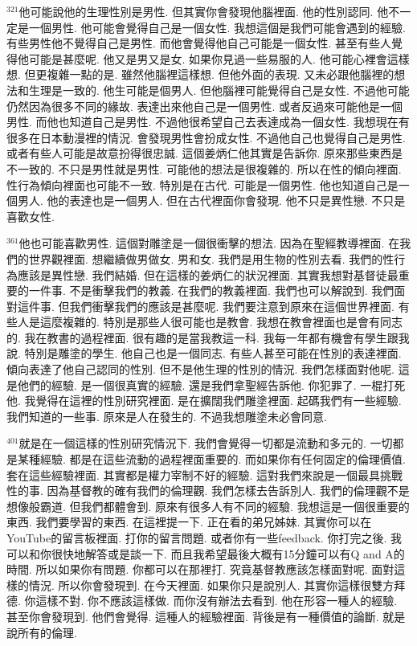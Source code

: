 \documentclass{book}
\begin{document}
$^{321}$他可能說他的生理性別是男性.
但其實你會發現他腦裡面.
他的性別認同.
他不一定是一個男性.
他可能會覺得自己是一個女性.
我想這個是我們可能會遇到的經驗.
有些男性他不覺得自己是男性.
而他會覺得他自己可能是一個女性.
甚至有些人覺得他可能是甚麼呢.
他又是男又是女.
如果你見過一些易服的人.
他可能心裡會這樣想.
但更複雜一點的是.
雖然他腦裡這樣想.
但他外面的表現.
又未必跟他腦裡的想法和生理是一致的.
他生可能是個男人.
但他腦裡可能覺得自己是女性.
不過他可能仍然因為很多不同的緣故.
表達出來他自己是一個男性.
或者反過來可能他是一個男性.
而他也知道自己是男性.
不過他很希望自己去表達成為一個女性.
我想現在有很多在日本動漫裡的情況.
會發現男性會扮成女性.
不過他自己也覺得自己是男性.
或者有些人可能是故意扮得很忠誠.
這個姜炳仁他其實是告訴你.
原來那些東西是不一致的.
不只是男性就是男性.
可能他的想法是很複雜的.
所以在性的傾向裡面.
性行為傾向裡面也可能不一致.
特別是在古代.
可能是一個男性.
他也知道自己是一個男人.
他的表達也是一個男人.
但在古代裡面你會發現.
他不只是異性戀.
不只是喜歡女性.

$^{361}$他也可能喜歡男性.
這個對雕塗是一個很衝擊的想法.
因為在聖經教導裡面.
在我們的世界觀裡面.
想繼續做男做女.
男和女.
我們是用生物的性別去看.
我們的性行為應該是異性戀.
我們結婚.
但在這樣的姜炳仁的狀況裡面.
其實我想對基督徒最重要的一件事.
不是衝擊我們的教義.
在我們的教義裡面.
我們也可以解說到.
我們面對這件事.
但我們衝擊我們的應該是甚麼呢.
我們要注意到原來在這個世界裡面.
有些人是這麼複雜的.
特別是那些人很可能也是教會.
我想在教會裡面也是會有同志的.
我在教書的過程裡面.
很有趣的是當我教這一科.
我每一年都有機會有學生跟我說.
特別是雕塗的學生.
他自己也是一個同志.
有些人甚至可能在性別的表達裡面.
傾向表達了他自己認同的性別.
但不是他生理的性別的情況.
我們怎樣面對他呢.
這是他們的經驗.
是一個很真實的經驗.
還是我們拿聖經告訴他.
你犯罪了.
一棍打死他.
我覺得在這裡的性別研究裡面.
是在擴闊我們雕塗裡面.
起碼我們有一些經驗.
我們知道的一些事.
原來是人在發生的.
不過我想雕塗未必會同意.

$^{401}$就是在一個這樣的性別研究情況下.
我們會覺得一切都是流動和多元的.
一切都是某種經驗.
都是在這些流動的過程裡面重要的.
而如果你有任何固定的倫理價值.
套在這些經驗裡面.
其實都是權力宰制不好的經驗.
這對我們來說是一個最具挑戰性的事.
因為基督教的確有我們的倫理觀.
我們怎樣去告訴別人.
我們的倫理觀不是想像般霸道.
但我們都體會到.
原來有很多人有不同的經驗.
我想這是一個很重要的東西.
我們要學習的東西.
在這裡提一下.
正在看的弟兄姊妹.
其實你可以在YouTube的留言板裡面.
打你的留言問題.
或者你有一些feedback.
你打完之後.
我可以和你很快地解答或是談一下.
而且我希望最後大概有15分鐘可以有Q and A的時間.
所以如果你有問題.
你都可以在那裡打.
究竟基督教應該怎樣面對呢.
面對這樣的情況.
所以你會發現到.
在今天裡面.
如果你只是說別人.
其實你這樣很雙方拜德.
你這樣不對.
你不應該這樣做.
而你沒有辦法去看到.
他在形容一種人的經驗.
甚至你會發現到.
他們會覺得.
這種人的經驗裡面.
背後是有一種價值的論斷.
就是說所有的倫理.
\end{document}
